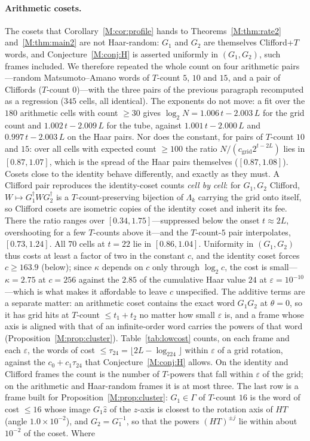 \documentclass[aps,prx,twocolumn,superscriptaddress,nofootinbib,longbibliography]{revtex4-2}
\theoremstyle{plain}
\theoremstyle{definition}
\theoremstyle{remark}
\begin{document}
\paragraph{Arithmetic cosets.} The cosets that Corollary~\ref{M:cor:profile} hands to Theorems~\ref{M:thm:rate2} and~\ref{M:thm:main2} are not Haar-random: $G_1$ and $G_2$ are themselves Clifford+$T$ words, and Conjecture~\ref{M:conj:H} is asserted uniformly in $(G_1,G_2)$, such frames included. We therefore repeated the whole count on four arithmetic pairs---random Matsumoto--Amano words of $T$-count $5$, $10$ and $15$, and a pair of Cliffords ($T$-count $0$)---with the three pairs of the previous paragraph recomputed as a regression ($345$ cells, all identical). The exponents do not move: a fit over the $180$ arithmetic cells with count $\ge30$ gives $\log_2N=1.006\,t-2.003\,L$ for the grid count and $1.002\,t-2.009\,L$ for the tube, against $1.001\,t-2.000\,L$ and $0.997\,t-2.003\,L$ on the Haar pairs. Nor does the constant, for pairs of $T$-count $10$ and $15$: over all cells with expected count $\ge100$ the ratio $N/(c_{\mathrm{grid}}2^{t-2L})$ lies in $[0.87,1.07]$, which is the spread of the Haar pairs themselves ($[0.87,1.08]$). Cosets close to the identity behave differently, and exactly as they must. A Clifford pair reproduces the identity-coset counts \emph{cell by cell}: for $G_1,G_2$ Clifford, $W\mapsto G_1^\dagger WG_2^\dagger$ is a $T$-count-preserving bijection of $\Lambda_k$ carrying the grid onto itself, so Clifford cosets are isometric copies of the identity coset and inherit its fee. There the ratio ranges over $[0.34,1.75]$---suppressed below the onset $t\approx2L$, overshooting for a few $T$-counts above it---and the $T$-count-$5$ pair interpolates, $[0.73,1.24]$. All $70$ cells at $t=22$ lie in $[0.86,1.04]$. Uniformity in $(G_1,G_2)$ thus costs at least a factor of two in the constant $c$, and the identity coset forces $c\ge163.9$ (below); since $\kappa$ depends on $c$ only through $\log_2c$, the cost is small---$\kappa=2.75$ at $c=256$ against the $2.85$ of the cumulative Haar value $24$ at $\varepsilon=10^{-10}$---which is what makes it affordable to leave $c$ unspecified. The additive terms are a separate matter: an arithmetic coset contains the exact word $G_1G_2$ at $\theta=0$, so it has grid hits at $T$-count $\le t_1+t_2$ no matter how small $\varepsilon$ is, and a frame whose axis is aligned with that of an infinite-order word carries the powers of that word (Proposition~\ref{M:prop:cluster}). Table~\ref{tab:lowcost} counts, on each frame and each $\varepsilon$, the words of cost $\le\tau_{24}=\lfloor2L-\log_224\rfloor$ within $\varepsilon$ of a grid rotation, against the $c_0+c_1\tau_{24}$ that Conjecture~\ref{M:conj:H} allows. On the identity and Clifford frames the count is the number of $T$-powers that fall within $\varepsilon$ of the grid; on the arithmetic and Haar-random frames it is at most three. The last row is a frame built for Proposition~\ref{M:prop:cluster}: $G_1\in\Gamma$ of $T$-count $16$ is the word of cost $\le16$ whose image $G_1\hat z$ of the $z$-axis is closest to the rotation axis of $HT$ (angle $1.0\times10^{-2}$), and $G_2=G_1^{-1}$, so that the powers $(HT)^{\pm j}$ lie within about $10^{-2}$ of the coset. Where 
\end{document}
